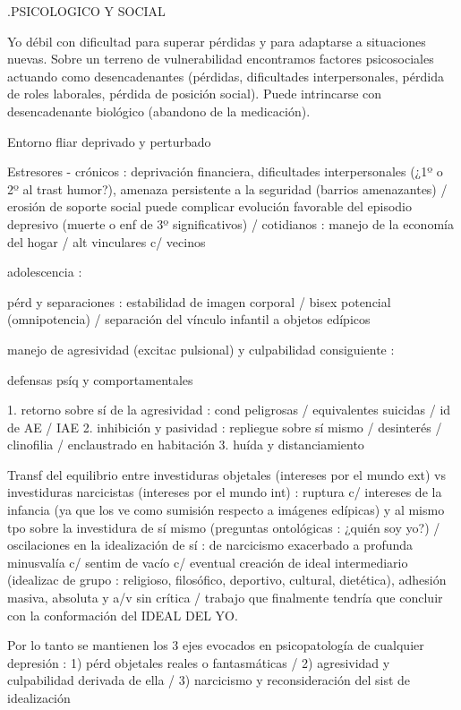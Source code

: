.PSICOLOGICO Y SOCIAL

Yo débil con dificultad para superar pérdidas y para adaptarse a situaciones nuevas. Sobre un terreno de vulnerabilidad encontramos factores psicosociales actuando como desencadenantes (pérdidas, dificultades interpersonales, pérdida de roles laborales, pérdida de posición social). Puede intrincarse con desencadenante biológico (abandono de la medicación).

Entorno fliar deprivado y perturbado

Estresores - crónicos : deprivación financiera, dificultades interpersonales (¿1º o 2º al trast humor?), amenaza persistente a la seguridad (barrios amenazantes) / erosión de soporte social puede complicar evolución favorable del episodio depresivo (muerte o enf de 3º significativos) / cotidianos : manejo de la economía del hogar / alt vinculares c/ vecinos

adolescencia :

pérd y separaciones : estabilidad de imagen corporal / bisex potencial (omnipotencia) / separación del vínculo infantil a objetos edípicos

manejo de agresividad (excitac pulsional) y culpabilidad consiguiente :

defensas psíq y comportamentales

1. retorno sobre sí de la agresividad : cond peligrosas / equivalentes suicidas / id de AE / IAE
2. inhibición y pasividad : repliegue sobre sí mismo / desinterés / clinofilia / enclaustrado en habitación
3. huída y distanciamiento

Transf del equilibrio entre investiduras objetales (intereses por el mundo ext) vs investiduras narcicistas (intereses por el mundo int) : ruptura c/ intereses de la infancia (ya que los ve como sumisión respecto a imágenes edípicas) y al mismo tpo sobre la investidura de sí mismo (preguntas ontológicas : ¿quién soy yo?) / oscilaciones en la idealización de sí : de narcicismo exacerbado a profunda minusvalía c/ sentim de vacío c/ eventual creación de ideal intermediario (idealizac de grupo : religioso, filosófico, deportivo, cultural, dietética), adhesión masiva, absoluta y a/v sin crítica / trabajo que finalmente tendría que concluir con la conformación del IDEAL DEL YO.

Por lo tanto se mantienen los 3 ejes evocados en psicopatología de cualquier depresión : 1) pérd objetales reales o fantasmáticas / 2) agresividad y culpabilidad derivada de ella / 3) narcicismo y reconsideración del sist de idealización

